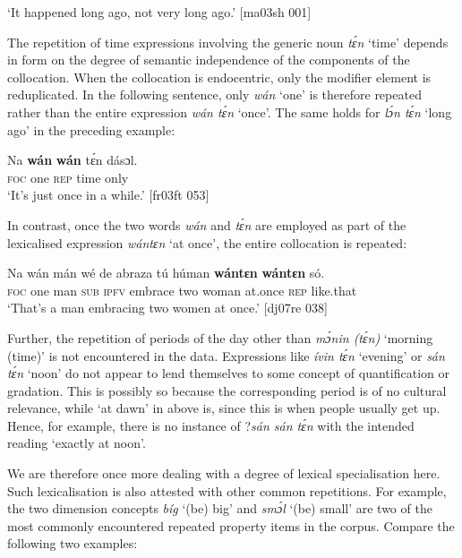 \glt ‘It happened long ago, not very long ago.’ [ma03sh 001]
\z

The repetition of time expressions involving the generic noun{\fff} \textit{tɛ́n} ‘time’ depends in form on the degree of semantic independence of the components of the collocation. When the collocation is endocentric, only the modifier element is reduplicated. In the following sentence, only \textit{wán} ‘one’ is therefore repeated rather than the entire expression \textit{wán tɛ́n} ‘once’. The same holds for \textit{lɔ́n tɛ́n} ‘long ago’ in the preceding example:


\ea%
    \label{ex:key:153}
    \gll Na  \textbf{wán}    \textbf{wán}    tɛ́n    dásɔl.\\
\textsc{foc}  one    \textsc{rep}    time    only\\

\glt ‘It’s just once in a while.’ [fr03ft 053]
\z

In contrast, once the two words \textit{wán} and \textit{tɛ́n} are employed as part of the lexicalised expression \textit{wántɛn} ‘at once’, the entire collocation is repeated:


\ea%
    \label{ex:key:154}
    \gll Na  wán    mán    wé  de  abraza  tú  húman  \textbf{wántɛn}  \textbf{wántɛn}  só.\\
\textsc{foc}  one    man    \textsc{sub}  \textsc{ipfv}  embrace  two  woman  at.once  \textsc{rep}    like.that\\

\glt ‘That’s a man embracing two women at once.’ [dj07re 038]
\z

Further, the repetition of periods of the day other than \textit{mɔ́nin (tɛ́n)} ‘morning (time)’ is not encountered in the data. Expressions like \textit{ívin tɛ́n} ‘evening’ or \textit{sán tɛ́n} ‘noon’ do not appear to lend themselves to some concept of quantification or gradation. This is possibly so because the corresponding period is of no cultural relevance, while ‘at dawn’ in  above is, since this is when people usually get up. Hence, for example, there is no instance of ?\textit{sán sán tɛ́n} with the intended reading ‘exactly at noon’. 


We are therefore once more dealing with a degree of lexical specialisation here. Such lexicalisation is also attested with other common repetitions. For example, the two dimension concepts \textit{bíg} ‘(be) big’ and \textit{smɔ́l} ‘(be) small’ are two of the most commonly encountered repeated property items in the corpus. Compare the following two examples: 



